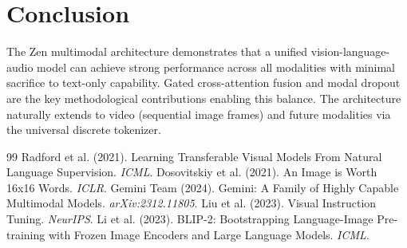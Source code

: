 \documentclass[11pt,a4paper]{article}
\begin{document}
\section{Conclusion}

The Zen multimodal architecture demonstrates that a unified vision-language-audio
model can achieve strong performance across all modalities with minimal sacrifice
to text-only capability. Gated cross-attention fusion and modal dropout are the
key methodological contributions enabling this balance. The architecture naturally
extends to video (sequential image frames) and future modalities via the universal
discrete tokenizer.


\begin{thebibliography}{99}
 Radford et al. (2021). Learning Transferable Visual Models From Natural Language Supervision. \textit{ICML}.
 Dosovitskiy et al. (2021). An Image is Worth 16x16 Words. \textit{ICLR}.
 Gemini Team (2024). Gemini: A Family of Highly Capable Multimodal Models. \textit{arXiv:2312.11805}.
 Liu et al. (2023). Visual Instruction Tuning. \textit{NeurIPS}.
 Li et al. (2023). BLIP-2: Bootstrapping Language-Image Pre-training with Frozen Image Encoders and Large Language Models. \textit{ICML}.
\end{thebibliography}
\end{document}

